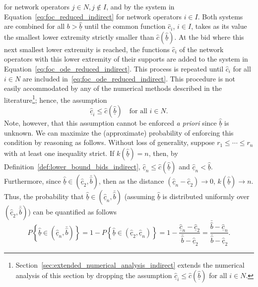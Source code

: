 for network operators $j\in N, j\not\in I$, and by the system in Equation~\eqref{eq:foc_reduced_indirect} for network operators $i\in I$. Both systems are combined for all $b > \underline{\hat{b}}$ until the common function $\hat{c}_i$, $i\in I$, takes as its value the smallest lower extremity strictly smaller than $\hat{c}(\underline{\hat{b}})$. At the bid where this next smallest lower extremity is reached, the functions $\hat{c}_i$ of the network operators with this lower extremity of their supports are added to the system in Equation~\eqref{eq:foc_ode_reduced_indirect}. This process is repeated until $\hat{c}_i$ for all $i\in N$ are included in~\eqref{eq:foc_ode_reduced_indirect}. This procedure is not easily accommodated by any of the numerical methods described in the literature\footnote{Section~\ref{sec:extended_numerical_analysis_indirect} extends the numerical analysis of this section by dropping the assumption $\underline{\hat{c}}_i \leq \hat{c}(\underline{\hat{b}})$ for all $i\in N$.}; hence, the assumption
\begin{equation*}
  \underline{\hat{c}}_i \leq \hat{c}(\underline{\hat{b}}) \quad\text{for all } i\in N.
\end{equation*}
Note, however, that this assumption cannot be enforced \emph{a priori} since $\underline{\hat{b}}$ is unknown. We can maximize the (approximate) probability of enforcing this condition by reasoning as follows. Without loss of generality, suppose $r_1\leq\cdots\leq r_n$ with at least one inequality strict. If $k(\underline{\hat{b}})=n$, then, by Definition~\ref{def:lower_bound_bids_indirect}, $\underline{\hat{c}}_n\leq \hat{c}(\underline{\hat{b}})$ and $\underline{\hat{c}}_n < \underline{\hat{b}}$. Furthermore, since $\underline{\hat{b}}\in (\underline{\hat{c}}_2, \bar{\hat{b}})$, then as the distance $(\underline{\hat{c}}_n-\underline{\hat{c}}_2)\to 0$, $k(\underline{\hat{b}})\to n$. Thus, the probability that $\underline{\hat{b}}\in (\underline{\hat{c}}_n, \bar{\hat{b}})$ (assuming $\underline{\hat{b}}$ is distributed uniformly over $(\underline{\hat{c}}_2, \bar{\hat{b}})$) can be quantified as follows
\begin{equation*}
  P\left\{ \underline{\hat{b}}\in (\underline{\hat{c}}_n, \bar{\hat{b}}) \right\} = 1 - P\left\{\underline{\hat{b}}\in(\underline{\hat{c}}_2, \underline{\hat{c}}_n)\right\} = 1 - \frac{\underline{\hat{c}}_n - \underline{\hat{c}}_2}{\bar{\hat{b}}-\underline{\hat{c}}_2} = \frac{\bar{\hat{b}} - \underline{\hat{c}}_n}{\bar{\hat{b}} - \underline{\hat{c}}_2}.
\end{equation*}
